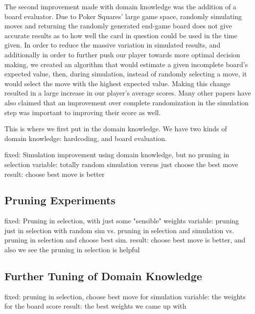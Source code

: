 \documentclass[letterpaper]{article}
\begin{document}
The second improvement made with domain knowledge was the addition of a board evaluator. Due to Poker Squares’ large game space, randomly simulating moves and returning the randomly generated end-game board does not give accurate results as to how well the card in question could be used in the time given.  
In order to reduce the massive variation in simulated results, and additionally in order to further push our player towards more optimal decision making, we created an algorithm that would estimate a given incomplete board’s expected value, then, during simulation, instead of randomly selecting a move, it would select the move with the highest expected value. 
Making this change resulted in a large increase in our player’s average scores. Many other papers have also claimed that an improvement over complete randomization in the simulation step was important to improving their score as well.

This is where we first put in the domain knowledge.
We have two kinds of domain knowledge: hardcoding, and board evaluation.

fixed: Simulation improvement using domain knowledge, but no pruning in selection
variable: totally random simulation versus just choose the best move 
result: choose best move is better

\subsection{Pruning Experiments}

fixed: Pruning in selection, with just some "sensible" weights
variable: pruning just in selection with random sim vs. pruning in selection and simulation vs. pruning in selection and choose best sim.
result: choose best move is better, and also we see the pruning in selection is helpful

\subsection{Further Tuning of Domain Knowledge}

fixed: pruning in selection, choose best move for simulation
variable: the weights for the board score
result: the best weights we came up with
\end{document}
